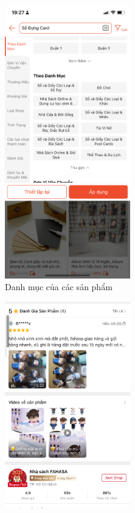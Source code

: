 \begin{figure}[H]
    \centering
    \begin{subfigure}[b]{0.4\textwidth}
        \centering
        \includegraphics[width=0.6\textwidth]{Category.PNG}
        \caption{Danh mục của các sản phẩm}
    \end{subfigure}
    \hfill
    \begin{subfigure}[b]{0.4\textwidth}
        \centering
        \includegraphics[width=0.6\textwidth]{Review_ratings.PNG}

\end{subfigure}
\end{figure}
